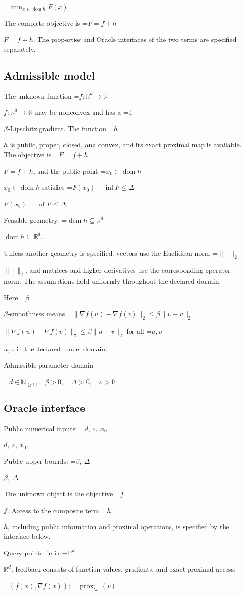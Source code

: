 \documentclass[10pt,a4paper]{article}
\newcommand{\AtlasMath}[1]{\par\begingroup\centering\setbox0=\hbox{$\displaystyle #1$}\ifdim\wd0>1.4\linewidth\typeout{ATLAS WIDE FORMULA: \the\wd0}\fi\ifdim\wd0>\linewidth\resizebox{\linewidth}{!}{\box0}\else\box0\fi\par\endgroup}
\newcommand{\AtlasInlineMath}[1]{\begingroup\setbox0=\hbox{$#1$}\ifdim\wd0>.4\linewidth\endgroup\AtlasMath{#1}\else\endgroup$#1$\fi}
\begin{document}
\AtlasMath{\min_{x\in \operatorname{dom}h}F(x)}


The complete objective is \AtlasInlineMath{F=f+h}. The properties and Oracle interfaces of the two terms are specified separately.

\subsection{Admissible model}
The unknown function \AtlasInlineMath{f:\mathbb R^d\to\mathbb R} may be nonconvex and has a \AtlasInlineMath{\beta}-Lipschitz gradient. The function \AtlasInlineMath{h} is public, proper, closed, and convex, and its exact proximal map is available. The objective is \AtlasInlineMath{F=f+h}, and the public point \AtlasInlineMath{x_0\in\operatorname{dom}h} satisfies \AtlasInlineMath{F(x_0)-\inf F\le\Delta}.

Feasible geometry: \AtlasInlineMath{\operatorname{dom}h\subseteq\mathbb{R}^d}.

Unless another geometry is specified, vectors use the Euclidean norm \AtlasInlineMath{\|\cdot\|_2}, and matrices and higher derivatives use the corresponding operator norm. The assumptions hold uniformly throughout the declared domain.

Here \AtlasInlineMath{\beta}-smoothness means \AtlasInlineMath{\|\nabla f(u)-\nabla f(v)\|_2\le\beta\|u-v\|_2} for all \AtlasInlineMath{u,v} in the declared model domain.

Admissible parameter domain:


\AtlasMath{d\in\mathbb{N}_{\ge1},\quad \beta>0,\quad \Delta>0,\quad \varepsilon>0}


\subsection{Oracle interface}
Public numerical inputs: \AtlasInlineMath{d,\ \varepsilon,\ x_0}.

Public upper bounds: \AtlasInlineMath{\beta,\ \Delta}.

The unknown object is the objective \AtlasInlineMath{f}. Access to the composite term \AtlasInlineMath{h}, including public information and proximal operations, is specified by the interface below.

Query points lie in \AtlasInlineMath{\mathbb{R}^d}; feedback consists of function values, gradients, and exact proximal access:


\AtlasMath{(f(x),\nabla f(x));\quad\operatorname{prox}_{\lambda h}(v)}
\end{document}
